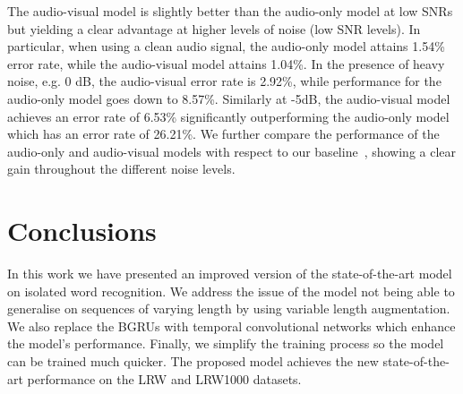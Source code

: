 \documentclass{article}
\begin{document}
 The audio-visual model is slightly better than the audio-only model at low SNRs but yielding a  clear advantage at  higher levels of noise (low SNR levels). In particular, when using a clean audio signal, the audio-only model attains 1.54\% error rate, while the audio-visual model attains 1.04\%. In the presence of heavy noise, e.g. 0 dB, the audio-visual error rate is 2.92\%, while performance for the audio-only model goes down to 8.57\%. Similarly at -5dB, the audio-visual model achieves an error rate of 6.53\%  significantly outperforming the audio-only model which has an error rate of 26.21\%. We further compare the performance of the audio-only and audio-visual models with respect to our baseline~\cite{petridis18}, showing a clear gain throughout the different noise levels.





\section{Conclusions}

In this work we have presented an improved version of the state-of-the-art model on isolated word recognition. We address the issue of the model not being able to generalise on sequences of varying length by using variable length augmentation. We also replace the BGRUs with temporal convolutional networks which enhance the model's performance. Finally, we simplify the training process so the model can be trained much quicker. The proposed model achieves the new state-of-the-art performance on the LRW and LRW1000 datasets.






\end{document}
